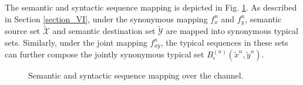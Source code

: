 \documentclass[12pt, draftclsnofoot,onecolumn]{IEEEtran}
\begin{document}
The semantic and syntactic sequence mapping is depicted in Fig. \ref{Sem_Syn_Seq_Mapping}. As described in Section \ref{section_VI}, under the synonymous mapping $f_x^n$ and $f_y^n$, semantic source set $\tilde {\mathcal{X}}$ and semantic destination set $\tilde {\mathcal{Y}}$ are mapped into synonymous typical sets. Similarly, under the joint mapping $f_{xy}^n$, the typical sequences in these sets can further compose the jointly synonymous typical set $B_{\epsilon}^{(n)}\left(\tilde{x}^n,\tilde{y}^n\right)$.
\begin{figure}[htbp]
\setlength{\abovecaptionskip}{0.cm}
\setlength{\belowcaptionskip}{-0.cm}
  \caption{Semantic and syntactic sequence mapping over the channel.}\label{Sem_Syn_Seq_Mapping}
\end{figure}
\end{document}
